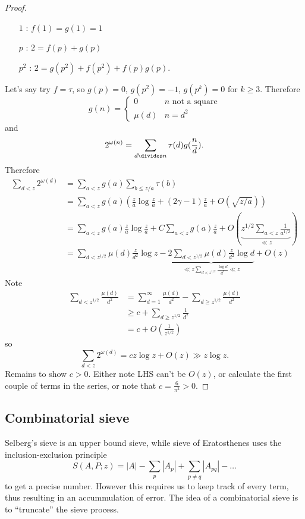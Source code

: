 \documentclass[a4paper]{article}
\theoremstyle{definition}
\begin{document}
\begin{proof}
\begin{enumerate}
  \item[\(1\)]: \(f(1) = g(1) = 1\)
  \item[\(p\)]: \(2 = f(p) + g(p)\)
  \item[\(p^2\)]: \(2 = g(p^2) + f(p^2) + f(p)g(p)\).
  \end{enumerate}
  Let's say try \(f = \tau\), so \(g(p) = 0\), \(g(p^2) = -1\), \(g(p^k) = 0\) for \(k \geq 3\). Therefore
  \[
    g(n) =
    \begin{cases}
      0 & n \text{ not a square} \\
      \mu(d) & n = d^2
    \end{cases}
  \]
  and
  \[
    2^{\omega(n)} = \sum_{d \divides n} \tau(d) g(\frac{n}{d}).
  \]
  Therefore
  \begin{align*}
    \sum_{d < z} 2^{\omega(d)}
    &= \sum_{a < z} g(a) \sum_{b \leq z/a} \tau(b) \\
    &= \sum_{a < z} g(a) \left( \frac{z}{a} \log \frac{z}{a} + (2\gamma - 1) \frac{z}{a} + O(\sqrt{z/a}) \right) \\
    &= \sum_{a < z} g(a) \frac{z}{a} \log \frac{z}{a} + C \sum_{a < z} g(a) \frac{z}{a} + O(\underbrace{z^{1/2} \sum_{a < z} \frac{1}{a^{1/2}}}_{\ll z}) \\
    &= \sum_{d < z^{1/2}} \mu(d) \frac{z}{d^2} \log z - \underbrace{2 \sum_{d < z^{1/2}} \mu(d) \frac{z}{d^2} \log d}_{\ll z \sum_{d < z^{1/2}} \frac{\log d}{d^2} \ll z} + O(z)
  \end{align*}
  Note
  \begin{align*}
    \sum_{d < z^{1/2}} \frac{\mu(d)}{d^2}
    &= \sum_{d = 1}^\infty \frac{\mu(d)}{d^2} - \sum_{d \geq z^{1/2}} \frac{\mu(d)}{d^2} \\
    &\geq c + \sum_{d \geq z^{1/2}} \frac{1}{d^2} \\
    &= c + O(\frac{1}{z^{1/2}})
  \end{align*}
  so
  \[
    \sum_{d < z} 2^{\omega(d)} = c z \log z + O(z) \gg z \log z.
  \]
  Remains to show \(c > 0\). Either note LHS can't be \(O(z)\), or calculate the first couple of terms in the series, or note that \(c = \frac{6}{\pi^2} > 0\).
\end{proof}

\subsection{Combinatorial sieve}

Selberg's sieve is an upper bound sieve, while sieve of Eratosthenes uses the inclusion-exclusion principle
\[
  S(A, P; z) = |A| - \sum_p |A_p| + \sum_{p \neq q} |A_{pq}| - \dots
\]
to get a precise number. However this requires us to keep track of every term, thus resulting in an accummulation of error. The idea of a combinatorial sieve is to ``truncate'' the sieve process.
\end{document}
